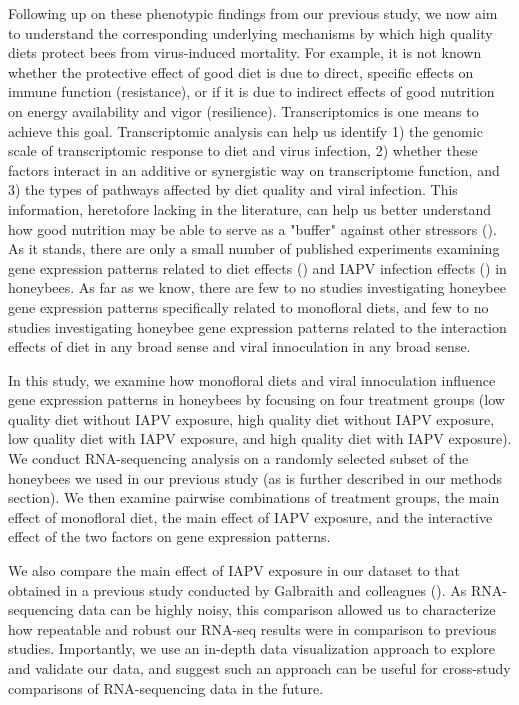 \documentclass[11pt,a4paper,oldfontcommands,openany]{memoir}
\numberwithin{equation}{section} %
\begin{document}
Following up on these phenotypic findings from our previous study, we now aim to understand the corresponding underlying mechanisms by which high quality diets protect bees from virus-induced mortality. For example, it is not known whether the protective effect of good diet is due to direct, specific effects on immune function (resistance), or if it is due to indirect effects of good nutrition on energy availability and vigor (resilience). Transcriptomics is one means to achieve this goal. Transcriptomic analysis can help us identify 1) the genomic scale of transcriptomic response to diet and virus infection, 2) whether these factors interact in an additive or synergistic way on transcriptome function, and 3) the types of pathways affected by diet quality and viral infection. This information, heretofore lacking in the literature, can help us better understand how good nutrition may be able to serve as a "buffer" against other stressors (\citealt{AdamTothReview}). As it stands, there are only a small number of published experiments examining gene expression patterns related to diet effects (\citealt{alaux2}) and IAPV infection effects (\citealt{galbraith}) in honeybees. As far as we know, there are few to no studies investigating honeybee gene expression patterns specifically related to monofloral diets, and few to no studies investigating honeybee gene expression patterns related to the interaction effects of diet in any broad sense and viral innoculation in any broad sense. 

In this study, we examine how monofloral diets and viral innoculation influence gene expression patterns in honeybees by focusing on four treatment groups (low quality diet without IAPV exposure, high quality diet without IAPV exposure, low quality diet with IAPV exposure, and high quality diet with IAPV exposure). We conduct RNA-sequencing analysis on a randomly selected subset of the honeybees we used in our previous study (as is further described in our methods section). We then examine pairwise combinations of treatment groups, the main effect of monofloral diet, the main effect of IAPV exposure, and the interactive effect of the two factors on gene expression patterns.

We also compare the main effect of IAPV exposure in our dataset to that obtained in a previous study conducted by Galbraith and colleagues (\citealt{galbraith}). As RNA-sequencing data can be highly noisy, this comparison allowed us to characterize how repeatable and robust our RNA-seq results were in comparison to previous studies. Importantly, we use an in-depth data visualization approach to explore and validate our data, and suggest such an approach can be useful for cross-study comparisons of RNA-sequencing data in the future.
\end{document}
